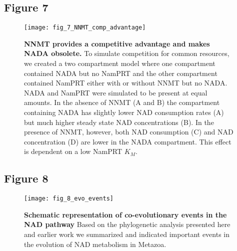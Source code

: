 \newpage


\subsection{Figure 7}

\begin{figure}[ht]
  \centering
  \texttt{[image: fig\_7\_NNMT\_comp\_advantage]}
  \caption{\textbf{NNMT provides a competitive advantage and makes NADA obsolete.} To simulate competition for common resources, we created a two compartment model where one compartment contained NADA but no NamPRT and the other compartment contained NamPRT either with or without NNMT but no NADA. NADA and NamPRT were simulated to be present at equal amounts.  In the absence of NNMT (A and B) the compartment containing NADA has slightly lower NAD consumption rates (A) but much higher steady state NAD concentrations (B). In the presence of NNMT, however, both NAD consumption (C) and NAD concentration (D) are lower in the NADA compartment. This effect is dependent on a low NamPRT $K_M$.}
  \label{fig:NNMT_comp_advantage}
\end{figure}

\newpage


\subsection{Figure 8}

\begin{figure}[ht]
  \centering
  \texttt{[image: fig\_8\_evo\_events]}
  \caption{\textbf{Schematic representation of co-evolutionary events in the NAD pathway} Based on the phylogenetic analysis presented here and earlier work  \cite{Lau2010} we summarized and indicated important events in the evolution of NAD metabolism in Metazoa.}
  \label{fig:evo_events}
\end{figure}


\newpage
